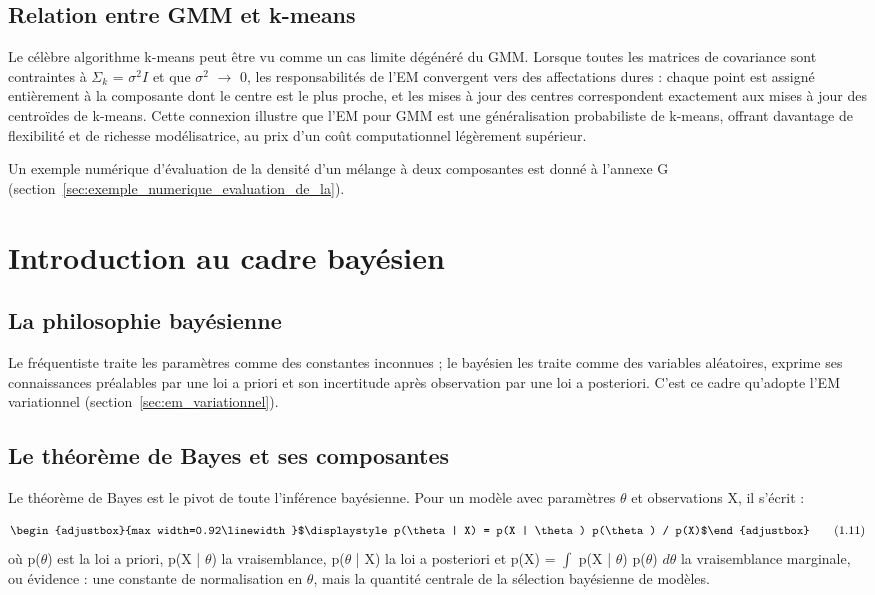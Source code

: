 \subsection{Relation entre GMM et k-means}\label{sec:relation_entre_gmm_et_k}
Le célèbre algorithme k-means peut être vu comme un cas limite dégénéré du GMM. Lorsque toutes les matrices de covariance sont contraintes à $\Sigma _{k}$ = $\sigma ^{2}I$ et que $\sigma ^{2}$ $\to $ 0, les responsabilités de l'EM convergent vers des affectations dures : chaque point est assigné entièrement à la composante dont le centre est le plus proche, et les mises à jour des centres correspondent exactement aux mises à jour des centroïdes de k-means. Cette connexion illustre que l'EM pour GMM est une généralisation probabiliste de k-means, offrant davantage de flexibilité et de richesse modélisatrice, au prix d'un coût computationnel légèrement supérieur.

Un exemple numérique d'évaluation de la densité d'un mélange à deux composantes est donné à l'annexe G (section~\ref{sec:exemple_numerique_evaluation_de_la}).

\section{Introduction au cadre bayésien}\label{sec:introduction_au_cadre_bayesien}
\subsection{La philosophie bayésienne}\label{sec:la_philosophie_bayesienne}
Le fréquentiste traite les paramètres comme des constantes inconnues ; le bayésien les traite comme des variables aléatoires, exprime ses connaissances préalables par une loi a priori et son incertitude après observation par une loi a posteriori. C'est ce cadre qu'adopte l'EM variationnel (section~\ref{sec:em_variationnel}).

\subsection{Le théorème de Bayes et ses composantes}\label{sec:le_theoreme_de_bayes_et}
Le théorème de Bayes est le pivot de toute l'inférence bayésienne. Pour un modèle avec paramètres $\theta $ et observations X, il s'écrit :

\begin{equation}
\begin{adjustbox}{max width=0.92\linewidth}$\displaystyle p(\theta | X) = p(X | \theta ) p(\theta ) / p(X)$\end{adjustbox}
\tag{1.11}
\label{eq:1_11}
\end{equation}
où p($\theta $) est la loi a priori, p(X | $\theta $) la vraisemblance, p($\theta $ | X) la loi a posteriori et p(X) = $\int $ p(X | $\theta $) p($\theta $) $d\theta $ la vraisemblance marginale, ou évidence : une constante de normalisation en $\theta $, mais la quantité centrale de la sélection bayésienne de modèles.

